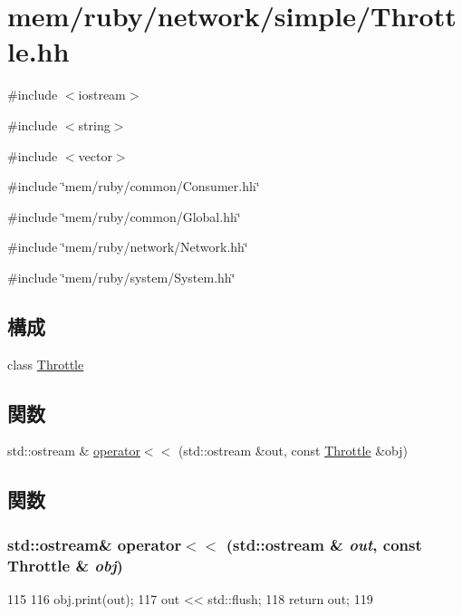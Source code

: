 \hypertarget{Throttle_8hh}{
\section{mem/ruby/network/simple/Throttle.hh}
\label{Throttle_8hh}
}
{\ttfamily \#include $<$iostream$>$}\par
{\ttfamily \#include $<$string$>$}\par
{\ttfamily \#include $<$vector$>$}\par
{\ttfamily \#include \char`\"{}mem/ruby/common/Consumer.hh\char`\"{}}\par
{\ttfamily \#include \char`\"{}mem/ruby/common/Global.hh\char`\"{}}\par
{\ttfamily \#include \char`\"{}mem/ruby/network/Network.hh\char`\"{}}\par
{\ttfamily \#include \char`\"{}mem/ruby/system/System.hh\char`\"{}}\par
\subsection*{構成}
\begin{DoxyCompactItemize}
\item 
class \hyperlink{classThrottle}{Throttle}
\end{DoxyCompactItemize}
\subsection*{関数}
\begin{DoxyCompactItemize}
\item 
std::ostream \& \hyperlink{Throttle_8hh_a2417663c494ddbe0b6d78d7c481101e2}{operator$<$$<$} (std::ostream \&out, const \hyperlink{classThrottle}{Throttle} \&obj)
\end{DoxyCompactItemize}


\subsection{関数}
\hypertarget{Throttle_8hh_a2417663c494ddbe0b6d78d7c481101e2}{
\subsubsection[{operator$<$$<$}]{\setlength{\rightskip}{0pt plus 5cm}std::ostream\& operator$<$$<$ (std::ostream \& {\em out}, \/  const {\bf Throttle} \& {\em obj})}}
\label{Throttle_8hh_a2417663c494ddbe0b6d78d7c481101e2}



\begin{DoxyCode}
115 {
116     obj.print(out);
117     out << std::flush;
118     return out;
119 }
\end{DoxyCode}

